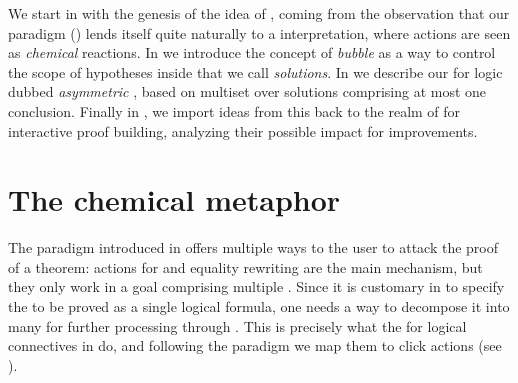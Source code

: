 \begin{scope}
We start in  with the genesis of the idea of , coming from the observation that our  paradigm
() lends itself quite naturally to a 
interpretation, where actions are seen as \emph{chemical} reactions. In
 we introduce the concept of \emph{bubble} as a way to control
the scope of hypotheses inside  that we call
\emph{solutions}. In  we describe our  for
 logic dubbed \emph{asymmetric }, based
on multiset  over solutions comprising at most one
conclusion. Finally in , we import ideas from this
 back to the realm of  for interactive proof
building, analyzing their possible impact for  improvements.

\section{The chemical metaphor}

The  paradigm introduced in  offers multiple ways to
the user to attack the proof of a theorem:  actions for 
and equality rewriting are the main mechanism, but they only work in a goal
comprising multiple . Since it is customary in  to specify
the  to be proved as a single logical formula, one needs a way to decompose
it into many  for further processing through . This is precisely what
the  for logical connectives in  do, and
following the  paradigm \cite{PbP} we map them to click
actions (see ).


\end{scope}
